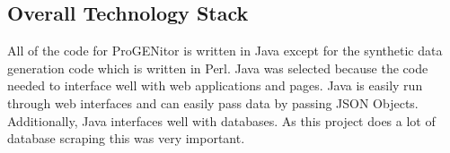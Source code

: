 \subsection{Overall Technology Stack}
All of the code for ProGENitor is written in Java except for the synthetic data
generation code which is written in Perl.  Java was selected because the code
needed to interface well with web applications and pages.  Java is easily run through
web interfaces and can easily pass data by passing JSON Objects.  Additionally,
Java interfaces well with databases.  As this project does a lot of database
scraping this was very important.
